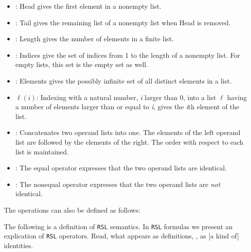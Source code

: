 \begin{itemize}
\item{:} Head gives the first element in a nonempty list. 
\item{:} Tail gives the remaining list of a nonempty list
  when Head is removed. 
\item{:} Length gives the number of elements in a finite list.
\item{:} Indices give the set of indices from \textsf{1} to
  the length of a nonempty list. For empty lists, this set is the
  empty set as well. 
\item{:} Elements gives the possibly infinite set of all
  distinct elements in a list. 
\item{$\ell(i)$:} Indexing with a natural number, \textsl{i} larger
  than 0, into a list $\ell$ having a number of elements larger than
  or equal to \textsl{i}, gives the \textsl{i}th element of the
  list. 
\item{\CONCAT:} Concatenates two operand lists into one. The elements
  of the left operand list are followed by the elements of the
  right. The order with respect to each list is maintained.  
\item{\EQ:} The equal operator  expresses that the two operand lists
  are identical.  
\item{\NOTEQ:} The nonequal operator expresses that the two operand
  lists are \emph{not} identical.  
\end{itemize}
\noindent
The operations can also be defined as follows:

\hhhh

The following is  a definition of \texttt{RSL} semantics.
In  \texttt{RSL} formulas we present an explication of  \texttt{RSL}
operators. Read, what appears as definitions, {\IS}, as [a kind of]
identities. 

